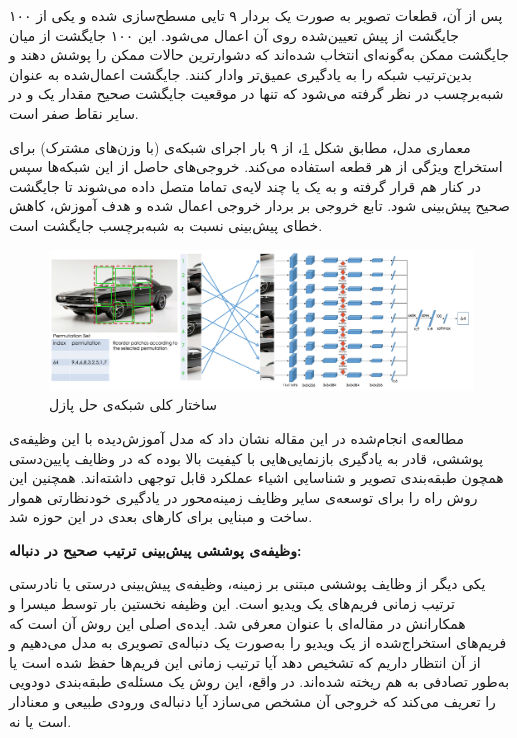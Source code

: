 پس از آن، قطعات تصویر به صورت یک بردار ۹ تایی مسطح‌سازی شده و یکی از ۱۰۰ جایگشت از پیش تعیین‌شده روی آن اعمال می‌شود. این ۱۰۰ جایگشت از میان  جایگشت ممکن به‌گونه‌ای انتخاب شده‌اند که دشوارترین حالات ممکن را پوشش دهند و بدین‌ترتیب شبکه را به یادگیری عمیق‌تر وادار کنند. جایگشت اعمال‌شده به عنوان شبه‌برچسب در نظر گرفته می‌شود که تنها در موقعیت جایگشت صحیح مقدار یک و در سایر نقاط صفر است.

معماری مدل، مطابق شکل \ref{fig:jigsaw}، از ۹ بار اجرای شبکه‌ی  (با وزن‌های مشترک) برای استخراج ویژگی از هر قطعه استفاده می‌کند. خروجی‌های حاصل از این شبکه‌ها سپس در کنار هم قرار گرفته و به یک یا چند لایه‌ی تماما متصل داده می‌شوند تا جایگشت صحیح پیش‌بینی شود. تابع خروجی  بر بردار خروجی اعمال شده و هدف آموزش، کاهش خطای پیش‌بینی نسبت به شبه‌برچسب جایگشت است.

\begin{figure}[htbp]
\centering
\includegraphics[width=1\textwidth]{Images/Chapter2/jigsaw.png}
\caption{ساختار کلی شبکه‌ی حل پازل}
\label{fig:jigsaw}
\end{figure}

مطالعه‌ی انجام‌شده در این مقاله نشان داد که مدل آموزش‌دیده با این وظیفه‌ی پوششی، قادر به یادگیری بازنمایی‌هایی با کیفیت بالا بوده که در وظایف پایین‌دستی همچون طبقه‌بندی تصویر و شناسایی اشیاء عملکرد قابل توجهی داشته‌اند. همچنین این روش راه را برای توسعه‌ی سایر وظایف زمینه‌محور در یادگیری خودنظارتی هموار ساخت و مبنایی برای کارهای بعدی\cite{li2021jigsawgan,park2024fine} در این حوزه شد. \newline

\noindent\textbf{وظیفه‌ی پوششی پیش‌بینی ترتیب صحیح در دنباله:}

یکی دیگر از وظایف پوششی مبتنی بر زمینه، وظیفه‌ی پیش‌بینی درستی یا نادرستی ترتیب زمانی فریم‌های یک ویدیو است. این وظیفه نخستین بار توسط میسرا و همکارانش در مقاله‌ای با عنوان  \cite{misra2016shuffle} معرفی شد. ایده‌ی اصلی این روش آن است که فریم‌های استخراج‌شده از یک ویدیو را به‌صورت یک دنباله‌ی تصویری به مدل می‌دهیم و از آن انتظار داریم که تشخیص دهد آیا ترتیب زمانی این فریم‌ها حفظ شده است یا به‌طور تصادفی به هم ریخته شده‌اند. در واقع، این روش یک مسئله‌ی طبقه‌بندی دودویی را تعریف می‌کند که خروجی آن مشخص می‌سازد آیا دنباله‌ی ورودی طبیعی و معنادار است یا نه.

